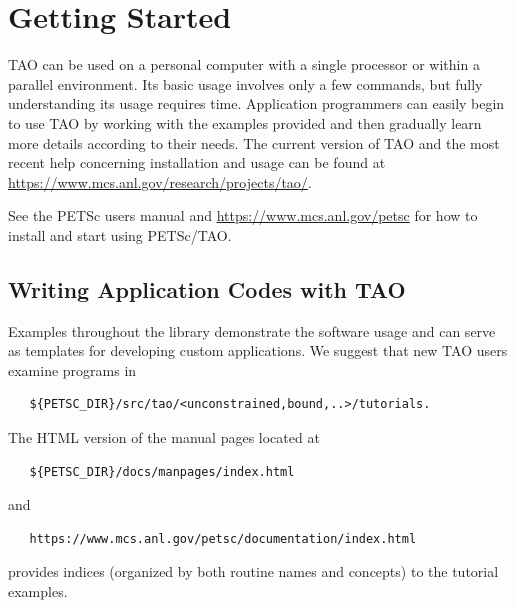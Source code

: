 \documentclass[]{book}
\begin{document}

\chapter{Getting Started}
\label{chapter_intro_tao}

TAO can be used on a personal
computer with a single processor or within a parallel environment.  
Its basic usage involves only a few commands, but fully 
understanding its usage requires time.
Application programmers can easily begin to use TAO by working with 
the examples provided and then gradually learn more details according to
their needs.  The current version of TAO and the most recent help 
concerning installation and usage can be found at  
\url{https://www.mcs.anl.gov/research/projects/tao/}.

See the PETSc users manual and \url{https://www.mcs.anl.gov/petsc} for how to install and start using PETSc/TAO.

\section{Writing Application Codes with TAO}

Examples throughout the library demonstrate the software usage and
can serve as templates for developing custom applications.  We suggest
that new TAO users examine programs in
\begin{verbatim}
   ${PETSC_DIR}/src/tao/<unconstrained,bound,..>/tutorials.
\end{verbatim} 
The HTML version of the manual pages located at
\begin{verbatim}
   ${PETSC_DIR}/docs/manpages/index.html
\end{verbatim} %
\noindent
and
\begin{verbatim}
   https://www.mcs.anl.gov/petsc/documentation/index.html
\end{verbatim}
\noindent
provides indices (organized by both routine names and concepts) to the
tutorial examples.
\end{document}

